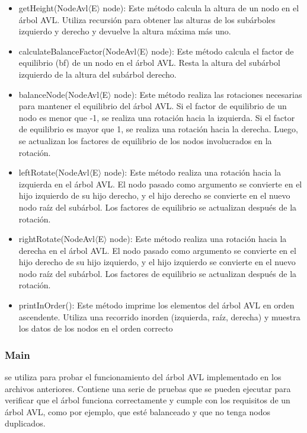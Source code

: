 \begin{itemize}
    \item getHeight(NodeAvl$\langle $E$\rangle$ node): Este método calcula la altura de un nodo en el árbol AVL. Utiliza recursión para obtener las alturas de los subárboles izquierdo y derecho y devuelve la altura máxima más uno.

\item calculateBalanceFactor(NodeAvl$\langle $E$\rangle$  node): Este método calcula el factor de equilibrio (bf) de un nodo en el árbol AVL. Resta la altura del subárbol izquierdo de la altura del subárbol derecho.

\item balanceNode(NodeAvl$\langle $E$\rangle$  node): Este método realiza las rotaciones necesarias para mantener el equilibrio del árbol AVL. Si el factor de equilibrio de un nodo es menor que -1, se realiza una rotación hacia la izquierda. Si el factor de equilibrio es mayor que 1, se realiza una rotación hacia la derecha. Luego, se actualizan los factores de equilibrio de los nodos involucrados en la rotación.

\item leftRotate(NodeAvl$\langle $E$\rangle$  node): Este método realiza una rotación hacia la izquierda en el árbol AVL. El nodo pasado como argumento se convierte en el hijo izquierdo de su hijo derecho, y el hijo derecho se convierte en el nuevo nodo raíz del subárbol. Los factores de equilibrio se actualizan después de la rotación.

\item rightRotate(NodeAvl$\langle $E$\rangle$  node): Este método realiza una rotación hacia la derecha en el árbol AVL. El nodo pasado como argumento se convierte en el hijo derecho de su hijo izquierdo, y el hijo izquierdo se convierte en el nuevo nodo raíz del subárbol. Los factores de equilibrio se actualizan después de la rotación.

\item printInOrder(): Este método imprime los elementos del árbol AVL en orden ascendente. Utiliza una recorrido inorden (izquierda, raíz, derecha) y muestra los datos de los nodos en el orden correcto
\end{itemize}






\subsubsection*{Main}
se utiliza para probar el funcionamiento del árbol AVL implementado en los archivos anteriores. Contiene una serie de pruebas que se pueden ejecutar para verificar que el árbol funciona correctamente y cumple con los requisitos de un árbol AVL, como por ejemplo, que esté balanceado y que no tenga nodos duplicados.

